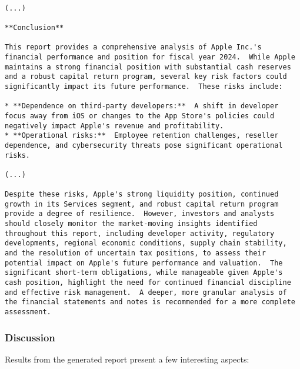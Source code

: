 \begin{verbatim}

(...)

**Conclusion**

This report provides a comprehensive analysis of Apple Inc.'s financial performance and position for fiscal year 2024.  While Apple maintains a strong financial position with substantial cash reserves and a robust capital return program, several key risk factors could significantly impact its future performance.  These risks include:

* **Dependence on third-party developers:**  A shift in developer focus away from iOS or changes to the App Store's policies could negatively impact Apple's revenue and profitability.
* **Operational risks:**  Employee retention challenges, reseller dependence, and cybersecurity threats pose significant operational risks.

(...)

Despite these risks, Apple's strong liquidity position, continued growth in its Services segment, and robust capital return program provide a degree of resilience.  However, investors and analysts should closely monitor the market-moving insights identified throughout this report, including developer activity, regulatory developments, regional economic conditions, supply chain stability, and the resolution of uncertain tax positions, to assess their potential impact on Apple's future performance and valuation.  The significant short-term obligations, while manageable given Apple's cash position, highlight the need for continued financial discipline and effective risk management.  A deeper, more granular analysis of the financial statements and notes is recommended for a more complete assessment.

\end{verbatim}

\subsubsection{Discussion}

Results from the generated report present a few interesting aspects:

